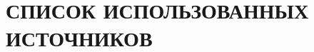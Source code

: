 {}
\chapter*{{\fontsize{14pt}{21pt}\selectfont\MakeUppercase{Список использованных источников}}}

\begingroup
\sloppy
\normalfont\fontsize{14pt}{21pt}\selectfont
\setlength{\emergencystretch}{3em}
\setlength{\parindent}{0pt}
\justifying
\makeatletter
\newcommand{\BibHttpsUrl}[2]{%
  {\normalfont\fontsize{14pt}{21pt}\selectfont
   \begingroup
   \def\UrlBreaks{\do\.\do\@\do\\\do\/\do\!\do\_\do\|\do\>\do\]\do\)\do\,\do\?\do\&\do'\do+\do\=\do\#}%
   \def\UrlBigBreaks{\do@url@hyp}%
   \Urlmuskip=0mu
   \href{https://#1#2}{\mbox{https://#1}\nolinkurl{#2}}%
   \endgroup}%
}
\newcommand{\BibPlainUrl}[1]{%
  {\normalfont\fontsize{14pt}{21pt}\selectfont
   \begingroup
   \def\UrlBreaks{\do\.\do\@\do\\\do\/\do\!\do\_\do\|\do\>\do\]\do\)\do\,\do\?\do\&\do'\do+\do\=\do\#}%
   \def\UrlBigBreaks{\do@url@hyp}%
   \Urlmuskip=0mu
   \url{#1}%
   \endgroup}%
}
\makeatother
{}
